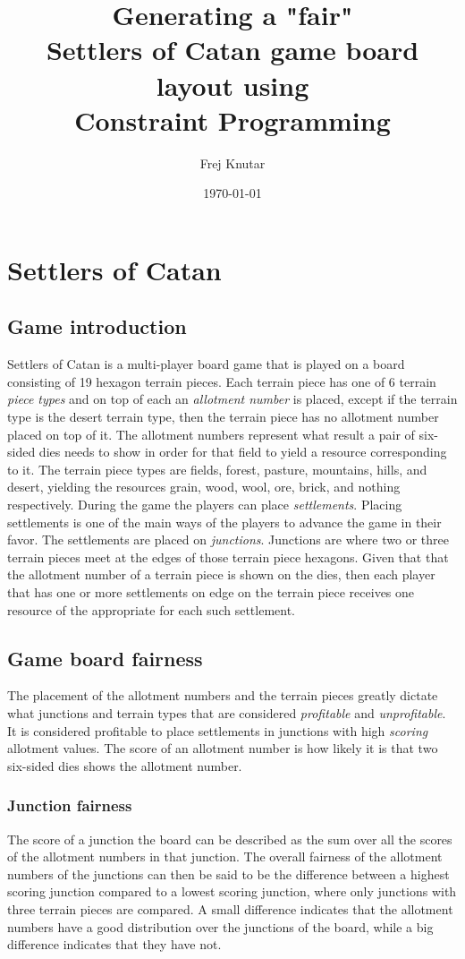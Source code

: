 \documentclass[a4paper,11pt]{article}
\title{\textbf{Generating a "fair" \\
    Settlers of Catan game board layout using \\
    Constraint Programming
  }
}
\author{Frej Knutar} %
\date{\today}
\begin{document}
\maketitle

\section{Settlers of Catan}

\subsection{Game introduction}
\label{sec:introduction}
Settlers of Catan\cite{settlers} is a multi-player board game that is played on a board consisting of 19 hexagon terrain pieces. Each terrain piece has one of 6 terrain \textit{piece types} and on top of each an \textit{allotment number} is placed, except if the terrain type is the desert terrain type, then the terrain piece has no allotment number placed on top of it. The allotment numbers represent what result a pair of six-sided dies needs to show in order for that field to yield a resource corresponding to it. The terrain piece types are fields, forest, pasture, mountains, hills, and desert, yielding the resources grain, wood, wool, ore, brick, and nothing respectively. During the game the players can place \textit{settlements}. Placing settlements is one of the main ways of the players to advance the game in their favor. The settlements are placed on \textit{junctions}. Junctions are where two or three terrain pieces meet at the edges of those terrain piece hexagons. Given that that the allotment number of a terrain piece is shown on the dies, then each player that has one or more settlements on edge on the terrain piece receives one resource of the appropriate for each such settlement.

\subsection{Game board fairness}
\label{sec:boardFairness}
The placement of the allotment numbers and the terrain pieces greatly dictate what junctions and terrain types that are considered \textit{profitable} and \textit{unprofitable}. It is considered profitable to place settlements in junctions with high \textit{scoring} allotment values. The score of an allotment number is how likely it is that two six-sided dies shows the allotment number.

\subsubsection{Junction fairness}
\label{sec:junctionFairness}
The score of a junction the board can be described as the sum over all the scores of the allotment numbers in that junction. The overall fairness of the allotment numbers of the junctions can then be said to be the difference between a highest scoring junction compared to a lowest scoring junction, where only junctions with three terrain pieces are compared. A small difference indicates that the allotment numbers have a good distribution over the junctions of the board, while a big difference indicates that they have not.
\end{document}
